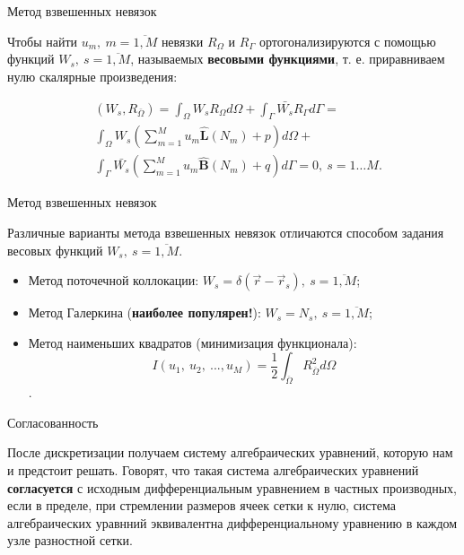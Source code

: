 \documentclass[12pt,xcolor=pst,aspectratio=169]{beamer}
\begin{document}
\begin{frame}{Метод взвешенных невязок}

	\transdissolve[duration=0.1]
	\justifying
	\large

	Чтобы найти $u_{m}, \: m = \overline{1, M}$ невязки $R_{\Omega}$ и $R_{\Gamma}$ ортогонализируются с помощью функций $W_{s}, \: s = \overline{1, M}$, называемых \textbf{весовыми функциями}, т. е. приравниваем нулю скалярные произведения:

	\[
		\begin{split}
			&\left( W_{s}, R_{\bar{\Omega}} \right) = \int_{\Omega} W_{s} R_{\Omega} d \Omega + \int_{\Gamma} \bar{W_{s}} R_{\Gamma} d \Gamma = \\
			&\int_{\Omega} W_{s} \left( \sum^{M}_{m = 1} u_{m} \hat{\textbf{L}} \left( N_{m} \right) + p \right) d \Omega + \\
			&\int_{\Gamma} \bar{W_{s}} \left( \sum^{M}_{m = 1} u_{m} \hat{\textbf{B}} \left( N_{m} \right) + q \right) d \Gamma = 0, \: s = 1 \ldots M.
		\end{split}
	\]

\end{frame}

\begin{frame}{Метод взвешенных невязок}

	\transdissolve[duration=0.1]
	\justifying
	\large

	Различные варианты метода взвешенных невязок отличаются способом задания весовых функций $W_{s}, \: s = \overline{1, M}$.

	\begin{itemize}
		\item Метод поточечной коллокации: $W_{s} = \delta \left( \vec{r} - \vec{r}_{s} \right), \: s = \overline{1, M}$;
		\item Метод Галеркина (\textbf{наиболее популярен!}): $W_{s} = N_{s}, \: s = \overline{1, M}$;
		\item Метод наименьших квадратов (минимизация функционала):
			\[
				I \left( u_{1}, \: u_{2}, \: ... , u_{M} \right) = \frac{1}{2} \int_{\overline{\Omega}} R^{2}_{\overline{\Omega}} d \Omega
			\].
	\end{itemize}

\end{frame}

\begin{frame}{Согласованность}

	\transdissolve[duration=0.1]
	\justifying
	\large

	После дискретизации получаем систему алгебраических уравнений, которую нам и предстоит решать. Говорят, что такая система алгебраических уравнений \textbf{согласуется} с исходным дифференциальным уравнением в частных производных, если в пределе, при стремлении размеров ячеек сетки к нулю, система алгебраических уравнний эквивалентна дифференциальному уравнению в каждом  узле разностной сетки.

\end{frame}
\end{document}
